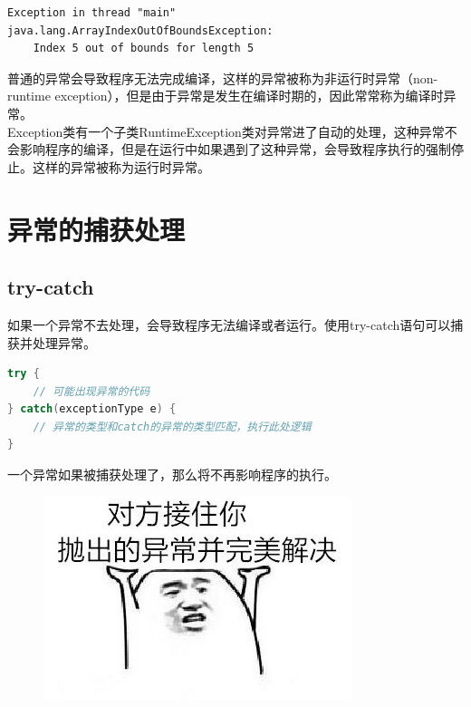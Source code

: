 \begin{tcolorbox}
	\begin{verbatim}
Exception in thread "main"
java.lang.ArrayIndexOutOfBoundsException:
    Index 5 out of bounds for length 5
	\end{verbatim}
\end{tcolorbox}

普通的异常会导致程序无法完成编译，这样的异常被称为非运行时异常（non-runtime exception），但是由于异常是发生在编译时期的，因此常常称为编译时异常。 \\

Exception类有一个子类RuntimeException类对异常进了自动的处理，这种异常不会影响程序的编译，但是在运行中如果遇到了这种异常，会导致程序执行的强制停止。这样的异常被称为运行时异常。

\newpage

\section{异常的捕获处理}

\subsection{try-catch}

如果一个异常不去处理，会导致程序无法编译或者运行。使用try-catch语句可以捕获并处理异常。

\vspace{-0.5cm}

\begin{lstlisting}[language=Java]
try {
    // 可能出现异常的代码
} catch(exceptionType e) {
    // 异常的类型和catch的异常的类型匹配，执行此处逻辑
}
\end{lstlisting}

一个异常如果被捕获处理了，那么将不再影响程序的执行。

\begin{figure}[H]
	\centering
	\includegraphics{img/C10/10-2/1.png}
\end{figure}

